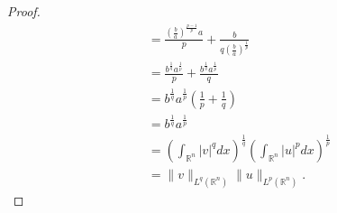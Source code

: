 \documentclass[11pt]{article}
\theoremstyle{definition}
\begin{document}
\begin{proof}
\begin{equation*}
\begin{aligned}
			       &= \frac{\left(\frac{b}{a}\right)^{\frac{p-1}{p}}a}{p} + \frac{b}{q\left(\frac{b}{a}\right)^{\frac{1}{p}}} \\
			       &= \frac{b^{\frac{1}{q}}a^{\frac{1}{p}}}{p} + \frac{b^{\frac{1}{q}}a^{\frac{1}{p}}}{q} \\
			       &= b^{\frac{1}{q}}a^{\frac{1}{p}}\left(\frac{1}{p} + \frac{1}{q}\right) \\
			       &= b^{\frac{1}{q}}a^{\frac{1}{p}} \\
			       &= \left(\int_{\mathbb{R}^n}|v|^qdx\right)^{\frac{1}{q}}\left(\int_{\mathbb{R}^n}|u|^pdx\right)^{\frac{1}{p}} \\
			       &= \|v\|_{L^q(\mathbb{R}^n)}\|u\|_{L^p(\mathbb{R}^n)}.
		\end{aligned}
	\end{equation*}
\end{proof}

\newpage
\end{document}
